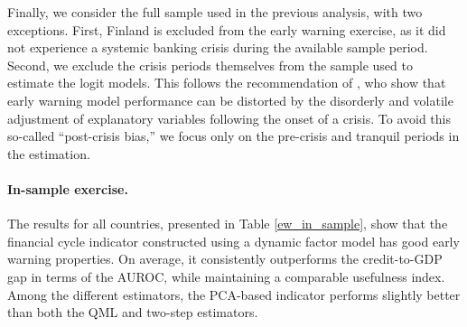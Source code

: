 Finally, we consider the full sample used in the previous analysis, with two exceptions. First, Finland is excluded from the early warning exercise, as it did not experience a systemic banking crisis during the available sample period. Second, we exclude the crisis periods themselves from the sample used to estimate the logit models. This follows the recommendation of \citet{bussiere2006towards}, who show that early warning model performance can be distorted by the disorderly and volatile adjustment of explanatory variables following the onset of a crisis. To avoid this so-called “post-crisis bias,” we focus only on the pre-crisis and tranquil periods in the estimation.

\paragraph{In-sample exercise.} The results for all countries, presented in Table \ref{ew_in_sample}, show that the financial cycle indicator constructed using a dynamic factor model has good early warning properties. On average, it consistently outperforms the credit-to-GDP gap in terms of the AUROC, while maintaining a comparable usefulness index. Among the different estimators, the PCA-based indicator performs slightly better than both the QML and two-step estimators.

